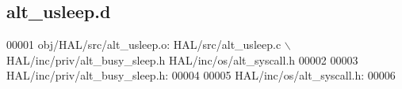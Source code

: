 \subsection{alt\+\_\+usleep.\+d}
\label{alt__usleep_8d_source}

\begin{DoxyCode}
00001 obj/HAL/src/alt\_usleep.o: HAL/src/alt\_usleep.c \(\backslash\)
 HAL/inc/priv/alt_busy_sleep.h HAL/inc/os/alt\_syscall.h
00002 
00003 HAL/inc/priv/alt_busy_sleep.h:
00004 
00005 HAL/inc/os/alt\_syscall.h:
00006 \end{DoxyCode}
